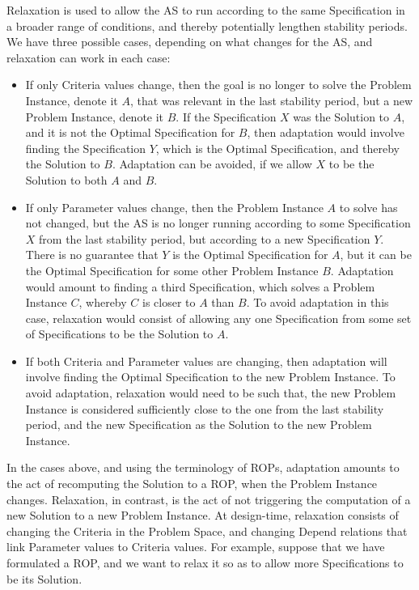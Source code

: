 \documentclass[graybox]{svmult}
\newcommand{\AS}{AS}
\newcommand{\ProblemSpace}{Problem Space}
\newcommand{\Specification}{Specification}
\newcommand{\Solution}{Solution}
\newcommand{\Criteria}{Criteria}
\newcommand{\ProblemInstance}{Problem Instance}
\newcommand{\Parameter}{Parameter}
\newcommand{\Depend}{Depend}
\newcommand{\OptimalSpecification}{Optimal Specification}
\newcommand{\ROP}{ROP}
\begin{document}
Relaxation is used to allow the \AS{} to run according to the same \Specification{} in a broader range of conditions, and thereby potentially lengthen stability periods. We have three possible cases, depending on what changes for the \AS, and relaxation can work in each case:
\begin{itemize}
    \item{If only \Criteria{} values change, then the goal is no longer to solve the \ProblemInstance, denote it $A$, that was relevant in the last stability period, but a new \ProblemInstance, denote it $B$.
If the \Specification{} $X$ was the \Solution{} to $A$, and it is not the \OptimalSpecification{} for $B$, then adaptation would involve finding the \Specification{} $Y$, which is the \OptimalSpecification, and thereby the \Solution{} to $B$. Adaptation can be avoided, if we allow $X$ to be the \Solution{} to both $A$ and $B$.}
    \item{If only \Parameter{} values change, then the \ProblemInstance{} $A$ to solve has not changed, but the \AS{} is no longer running according to some \Specification{} $X$ from the last stability period, but according to a new \Specification{} $Y$. There is no guarantee that $Y$ is the \OptimalSpecification{} for $A$, but it can be the \OptimalSpecification{} for some other \ProblemInstance{} $B$. Adaptation would amount to finding a third \Specification, which solves a \ProblemInstance{} $C$, whereby $C$ is closer to $A$ than $B$. To avoid adaptation in this case, relaxation would consist of allowing any one \Specification{} from some set of \Specification s to be the \Solution{} to $A$.}
    \item{If both \Criteria{} and \Parameter{} values are changing, then adaptation will involve finding the \OptimalSpecification{} to the new \ProblemInstance. To avoid adaptation, relaxation would need to be such that, the new \ProblemInstance{} is considered sufficiently close to the one from the last stability period, and the new \Specification{} as the \Solution{} to the new \ProblemInstance.}
\end{itemize}

In the cases above, and using the terminology of \ROP s, adaptation amounts to the act of recomputing the \Solution{} to a \ROP, when the \ProblemInstance{} changes. Relaxation, in contrast, is the act of not triggering the computation of a new \Solution{} to a new \ProblemInstance. At design-time, relaxation consists of changing the \Criteria{} in the \ProblemSpace, and changing \Depend{} relations that link \Parameter{} values to \Criteria{} values. For example, suppose that we have formulated a \ROP, and we want to relax it so as to allow more \Specification s to be its \Solution. 
\end{document}
